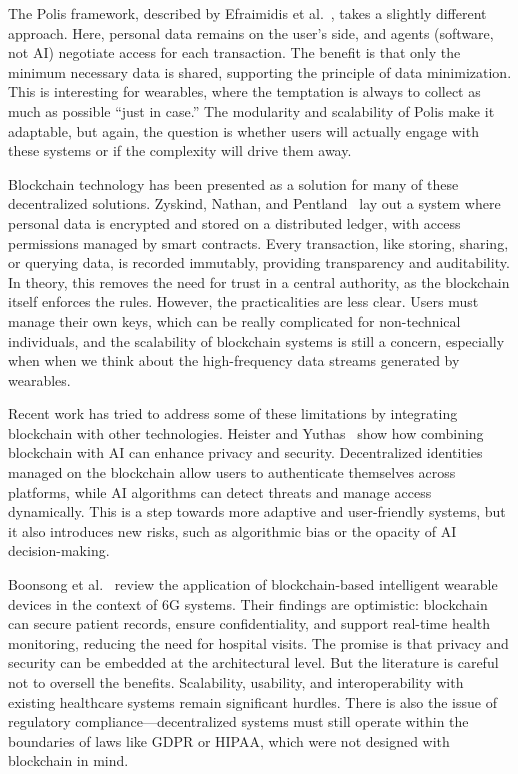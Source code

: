	The Polis framework, described by Efraimidis et al.~\cite{Efraimidis2008}, takes a slightly different approach. Here, personal data remains on the user’s side, and agents (software, not AI) negotiate access for each transaction. The benefit is that only the minimum necessary data is shared, supporting the principle of data minimization. This is interesting for wearables, where the temptation is always to collect as much as possible “just in case.” The modularity and scalability of Polis make it adaptable, but again, the question is whether users will actually engage with these systems or if the complexity will drive them away.

	Blockchain technology has been presented as a solution for many of these decentralized solutions. Zyskind, Nathan, and Pentland~\cite{Zyskind2015} lay out a system where personal data is encrypted and stored on a distributed ledger, with access permissions managed by smart contracts. Every transaction, like storing, sharing, or querying data, is recorded immutably, providing transparency and auditability. In theory, this removes the need for trust in a central authority, as the blockchain itself enforces the rules. However, the practicalities are less clear. Users must manage their own keys, which can be really complicated for non-technical individuals, and the scalability of blockchain systems is still a concern, especially when when we think about the high-frequency data streams generated by wearables.

	Recent work has tried to address some of these limitations by integrating blockchain with other technologies. Heister and Yuthas~\cite{Heister2021} show how combining blockchain with AI can enhance privacy and security. Decentralized identities managed on the blockchain allow users to authenticate themselves across platforms, while AI algorithms can detect threats and manage access dynamically. This is a step towards more adaptive and user-friendly systems, but it also introduces new risks, such as algorithmic bias or the opacity of AI decision-making.

	Boonsong et al.~\cite{Boonsong2024} review the application of blockchain-based intelligent wearable devices in the context of 6G systems. Their findings are optimistic: blockchain can secure patient records, ensure confidentiality, and support real-time health monitoring, reducing the need for hospital visits. The promise is that privacy and security can be embedded at the architectural level. But the literature is careful not to oversell the benefits. Scalability, usability, and interoperability with existing healthcare systems remain significant hurdles. There is also the issue of regulatory compliance—decentralized systems must still operate within the boundaries of laws like GDPR or HIPAA, which were not designed with blockchain in mind.

